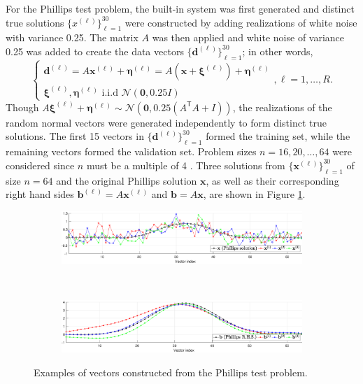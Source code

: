 \documentclass[12pt]{article}
\newcommand{\bVec}{\mathbf{b}}	%
\newcommand{\dVec}{\mathbf{d}}	%
\newcommand{\xVec}{\mathbf{x}}	%
\newcommand{\trans}[1]{{#1}^\mathsf{T}}	%
\newcommand{\noise}{\eta}	%
\newcommand{\noiseVec}{\bm{\noise}}	%
\newcommand{\zeroVec}{\bm{0}}	%
\begin{document}
For the Phillips test problem, the built-in system was first generated and distinct true solutions $\{x^{(\ell)}\}_{\ell=1}^{30}$ were constructed by adding realizations of white noise with variance 0.25. The matrix $A$ was then applied and white noise of variance 0.25 was added to create the data vectors $\{\dVec^{(\ell)}\}_{\ell=1}^{30}$; in other words,
\[\begin{cases}
\dVec^{(\ell)} = A\xVec^{(\ell)} + \noiseVec^{(\ell)} = A(\xVec + \bm{\xi}^{(\ell)}) + \noiseVec^{(\ell)} \\
\bm{\xi}^{(\ell)},\noiseVec^{(\ell)} \textrm{ i.i.d } \mathcal{N}(\zeroVec, 0.25I) 
\end{cases}, \ell = 1,\ldots,R.\]
Though $A\bm{\xi}^{(\ell)} + \noiseVec^{(\ell)} \sim \mathcal{N}(\zeroVec,0.25(\trans{A}A + I))$, the realizations of the random normal vectors were generated independently to form distinct true solutions. The first 15 vectors in $\{\dVec^{(\ell)}\}_{\ell=1}^{30}$ formed the training set, while the remaining vectors formed the validation set. Problem sizes $n = 16, 20, \ldots, 64$ were considered since $n$ must be a multiple of 4 \cite{Regtools}. Three solutions from $\{\xVec^{(\ell)}\}_{\ell=1}^{30}$ of size $n = 64$ and the original Phillips solution $\xVec$, as well as their corresponding right hand sides $\bVec^{(\ell)} = A\xVec^{(\ell)}$ and $\bVec = A\xVec$, are shown in Figure \ref{fig:Phillips}.

\begin{figure}[ht]
\begin{subfigure}{\textwidth}
\includegraphics[scale=0.36]{Figures/Phillips-Solutions}
\subcaption{}
\end{subfigure} \\
\begin{subfigure}{\textwidth}
\includegraphics[scale=0.36]{Figures/Phillips-RHS}
\subcaption{}
\end{subfigure}
\caption{Examples of vectors constructed from the Phillips test problem.}
\label{fig:Phillips}
\end{figure}
\end{document}
